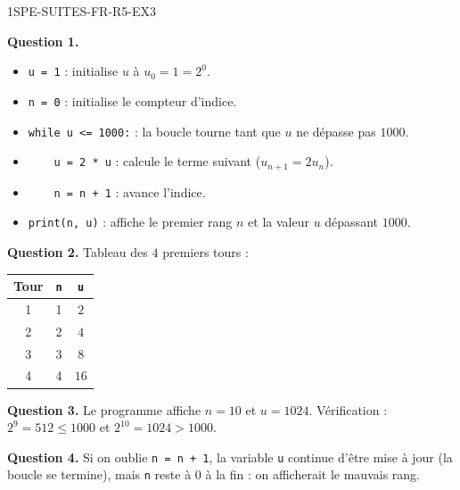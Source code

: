 \begin{corrige}{1SPE-SUITES-FR-R5-EX3}


\textbf{Question 1.}
\begin{itemize}
  \item \verb|u = 1| : initialise $u$ à $u_0 = 1 = 2^0$.
  \item \verb|n = 0| : initialise le compteur d'indice.
  \item \verb|while u <= 1000:| : la boucle tourne tant que $u$ ne dépasse pas $1000$.
  \item \verb|    u = 2 * u| : calcule le terme suivant ($u_{n+1} = 2u_n$).
  \item \verb|    n = n + 1| : avance l'indice.
  \item \verb|print(n, u)| : affiche le premier rang $n$ et la valeur $u$ dépassant $1000$.
\end{itemize}

\textbf{Question 2.} Tableau des $4$ premiers tours :

\begin{center}
\begin{tabular}{|c|c|c|}
\hline
Tour & \verb|n| & \verb|u| \\
\hline
1 & 1 & $2$ \\
2 & 2 & $4$ \\
3 & 3 & $8$ \\
4 & 4 & $16$ \\
\hline
\end{tabular}
\end{center}

\textbf{Question 3.} Le programme affiche $n = 10$ et $u = 1024$. Vérification : $2^9 = 512 \leq 1000$ et $2^{10} = 1024 > 1000$. \checkmark


\textbf{Question 4.} Si on oublie \verb|n = n + 1|, la variable \verb|u| continue d'être mise à jour (la boucle se termine), mais \verb|n| reste à $0$ à la fin : on afficherait le mauvais rang.

\end{corrige}


